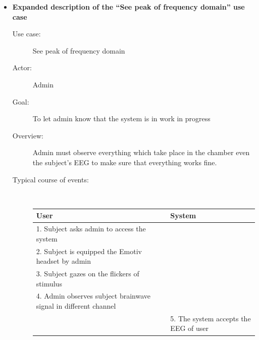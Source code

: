 \begin{itemize}

\item \textbf{Expanded description of the “See peak of frequency domain” use case}

\begin{description}
	\item [Use case:] See peak of frequency domain 
	\item [Actor:] Admin 
	\item [Goal:] To let admin know that the system is in work in progress 
	\item [Overview:] Admin must observe everything which take place in the chamber even the subject’s EEG to make sure that everything works fine.   
	\item [Typical course of events:]~
	
	{
		\centering
		
		\begin{tabular}{| m{.47\linewidth} | m{.47\linewidth} |}
			
			\hline 
			\textbf{User} & \textbf{System}  \\
			\hline 
			1. Subject asks admin to access the system &   \\
			\hline 
			2. Subject is equipped the Emotiv headset by admin  &   \\
			\hline 
			3. Subject gazes on the flickers of stimulus & \\
			\hline 
			4. Admin observes subject brainwave signal in different channel & \\
			\hline
			& 5. The system accepts the EEG of user \\
			\hline
			

\end{tabular}}
\end{description}
\end{itemize}
